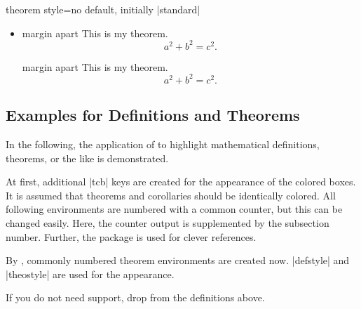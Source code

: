 \begin{docTcbKey}{theorem style}{=}{no default, initially |standard|}
\begin{itemize}
\begin{dispExample}
\begin{theorem}[theorem style=margin break,left=10mm]{margin break}{}
\end{theorem}
\begin{theorem}[theorem style=margin break,left=10mm,oversize]{margin break}{}
This is my theorem. \begin{equation*} a^2 + b^2 = c^2. \end{equation*}
\end{theorem}
\end{dispExample}
%
\item{}
\begin{dispExample}
\begin{theorem}[theorem style=margin apart,left=10mm]{margin apart}{}
This is my theorem. \begin{equation*} a^2 + b^2 = c^2. \end{equation*}
\end{theorem}
\begin{theorem}[theorem style=margin apart,left=10mm,oversize]{margin apart}{}
This is my theorem. \begin{equation*} a^2 + b^2 = c^2. \end{equation*}
\end{theorem}
\end{dispExample}
%
\end{itemize}
\end{docTcbKey}


%
\clearpage
\subsection{Examples for Definitions and Theorems}
In the following, the application of 
to highlight mathematical definitions, theorems, or the like is demonstrated.

At first, additional |tcb| keys are created for the appearance of
the colored boxes. It is assumed that theorems and corollaries should be
identically colored.
All following environments are numbered with a common counter, but this
can be changed easily. Here, the counter output is supplemented by
the subsection number.
Further, the  package \cite{barros:zref-clever} is used for clever
references.


By , commonly numbered theorem environments are
created now. |defstyle| and |theostyle| are used for the appearance.

\begin{marker}
If you do not need  support, drop 
from the definitions above.
\end{marker}


